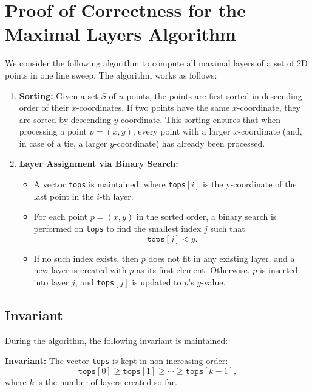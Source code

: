 \documentclass[a4paper]{article}
\begin{document}
\vspace{3mm}
\section*{Proof of Correctness for the Maximal Layers Algorithm}

We consider the following algorithm to compute all maximal layers of a set of 2D points in one line sweep. The algorithm works as follows:
\begin{enumerate}[label=\arabic*.]
    \item \textbf{Sorting:} Given a set $S$ of $n$ points, the points are first sorted in descending order of their $x$-coordinates. If two points have the same $x$-coordinate, they are sorted by descending $y$-coordinate. This sorting ensures that when processing a point $p = (x,y)$, every point with a larger $x$-coordinate (and, in case of a tie, a larger $y$-coordinate) has already been processed.
    
    \item \textbf{Layer Assignment via Binary Search:} 
    \begin{itemize}
        \item A vector \texttt{tops} is maintained, where \texttt{tops}$[i]$ is the y-coordinate of the last point in the $i$-th layer.
        
        \item For each point $p=(x,y)$ in the sorted order, a binary search is performed on \texttt{tops} to find the smallest index $j$ such that 
        \[
        \texttt{tops}[j] < y.
        \]
        \item If no such index exists, then $p$ does not fit in any existing layer, and a new layer is created with $p$ as its first element. Otherwise, $p$ is inserted into layer $j$, and \texttt{tops}$[j]$ is updated to $p$'s $y$-value.
    \end{itemize}
\end{enumerate}

\vspace{2mm}
\subsection*{Invariant}
During the algorithm, the following invariant is maintained:

\medskip
\noindent\textbf{Invariant:} The vector \texttt{tops} is kept in non-increasing order:
\[
\texttt{tops}[0] \ge \texttt{tops}[1] \ge \cdots \ge \texttt{tops}[k-1],
\]
where $k$ is the number of layers created so far.
\end{document}
